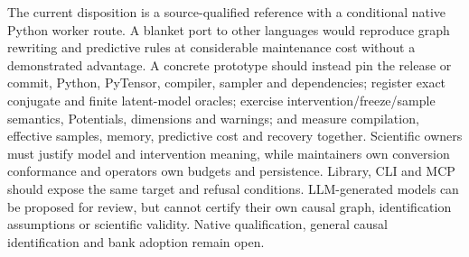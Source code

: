 The current disposition is a source-qualified reference with a conditional
native Python worker route. A blanket port to other languages would reproduce
graph rewriting and predictive rules at considerable maintenance cost without
a demonstrated advantage. A concrete prototype should instead pin the release
or commit, Python, PyTensor, compiler, sampler and dependencies; register exact
conjugate and finite latent-model oracles; exercise intervention/freeze/sample
semantics, Potentials, dimensions and warnings; and measure compilation,
effective samples, memory, predictive cost and recovery together. Scientific
owners must justify model and intervention meaning, while maintainers own
conversion conformance and operators own budgets and persistence. Library,
CLI and MCP should expose the same target and refusal conditions. LLM-generated
models can be proposed for review, but cannot certify their own causal graph,
identification assumptions or scientific validity. Native qualification,
general causal identification and bank adoption remain open.
\citep{exec23_pymc_sources,exec23_pymc_reference}

